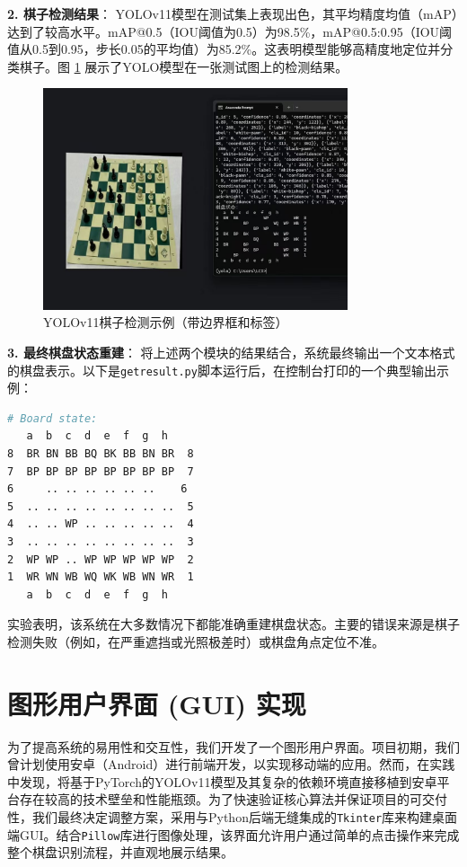 \documentclass[12pt, a4paper]{article}
\begin{document}
\textbf{2. 棋子检测结果}：
YOLOv11模型在测试集上表现出色，其平均精度均值（mAP）达到了较高水平。mAP@0.5（IOU阈值为0.5）为98.5\%，mAP@0.5:0.95（IOU阈值从0.5到0.95，步长0.05的平均值）为85.2\%。这表明模型能够高精度地定位并分类棋子。图 \ref{fig:yolo} 展示了YOLO模型在一张测试图上的检测结果。

\begin{figure}[h!]
    \centering
    \includegraphics[width=0.8\textwidth]{image/yolo_result.jpg} %
    \caption{YOLOv11棋子检测示例（带边界框和标签）}
    \label{fig:yolo}
\end{figure}

\textbf{3. 最终棋盘状态重建}：
将上述两个模块的结果结合，系统最终输出一个文本格式的棋盘表示。以下是\texttt{getresult.py}脚本运行后，在控制台打印的一个典型输出示例：
\begin{lstlisting}[language=bash, caption={最终重建的棋盘状态输出}]
# Board state:
   a  b  c  d  e  f  g  h
8  BR BN BB BQ BK BB BN BR  8
7  BP BP BP BP BP BP BP BP  7
6     .. .. .. .. .. ..    6
5  .. .. .. .. .. .. .. ..  5
4  .. .. WP .. .. .. .. ..  4
3  .. .. .. .. .. .. .. ..  3
2  WP WP .. WP WP WP WP WP  2
1  WR WN WB WQ WK WB WN WR  1
   a  b  c  d  e  f  g  h
\end{lstlisting}
实验表明，该系统在大多数情况下都能准确重建棋盘状态。主要的错误来源是棋子检测失败（例如，在严重遮挡或光照极差时）或棋盘角点定位不准。

\section{图形用户界面 (GUI) 实现}
为了提高系统的易用性和交互性，我们开发了一个图形用户界面。项目初期，我们曾计划使用安卓（Android）进行前端开发，以实现移动端的应用。然而，在实践中发现，将基于PyTorch的YOLOv11模型及其复杂的依赖环境直接移植到安卓平台存在较高的技术壁垒和性能瓶颈。为了快速验证核心算法并保证项目的可交付性，我们最终决定调整方案，采用与Python后端无缝集成的\texttt{Tkinter}库来构建桌面端GUI。结合\texttt{Pillow}库进行图像处理，该界面允许用户通过简单的点击操作来完成整个棋盘识别流程，并直观地展示结果。
\end{document}
